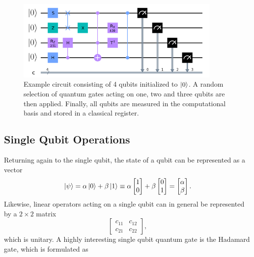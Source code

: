 \begin{figure}[htp]
    \centering
    \includegraphics[width=10cm]{latex/figures/example_circuit.png}
    \caption{Example circuit consisting of 4 qubits initialized to $\ket{0}$. A random selection of quantum gates acting on one, two and three qubits are then applied. Finally, all qubits are measured in the computational basis and stored in a classical register.}
    \label{fig:exampleCircuit}
\end{figure}

\subsection{Single Qubit Operations}\label{sec:ControlledOperations}

Returning again to the single qubit, the state of a qubit can be represented as a vector
\begin{equation}\label{eq:vectorRepresentation}
\ket{\psi} = \alpha \ket{0} + \beta \ket{1} \equiv \alpha 
    \begin{bmatrix}
        1 \\
        0
    \end{bmatrix} + 
    \beta \begin{bmatrix}
        0 \\
        1
    \end{bmatrix}
    =
    \begin{bmatrix}
        \alpha \\
        \beta
    \end{bmatrix}.
\end{equation}
Likewise, linear operators acting on a single qubit can in general be represented by a $2\times 2$ matrix 
\begin{equation}\label{eq:matrixRepresentation}
    \begin{bmatrix}
        c_{11} & c_{12} \\
        c_{21} & c_{22}
    \end{bmatrix},
\end{equation}
which is unitary. A highly interesting single qubit quantum gate is the Hadamard gate, which is formulated as 

